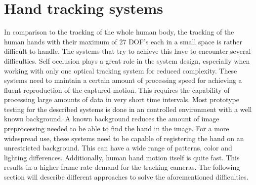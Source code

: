 \section{Hand tracking systems}
\label{hand-tracking_systems}
In comparison to the tracking of the whole human body, the tracking of the human hands with their maximum of 27 DOF's each in a small space is rather difficult to handle.
The systems that try to achieve this have to encounter several difficulties. Self occlusion plays a great role in the system design, especially when working with only one optical tracking system for reduced complexity.  These systems need to maintain a certain amount of processing speed for achieving a fluent reproduction of the captured motion. This requires the capability of processing large amounts of data in very short time intervals. Most prototype testing for the described systems is done in an controlled environment with a well known background. A known background reduces the amount of image preprocessing needed to be able to find the hand in the image. For a more widespread use, these systems need to be capable of registering the hand on an unrestricted background. This can have a wide range of patterns, color and lighting differences. Additionally, human hand motion itself is quite fast. This results in a higher frame rate demand for the tracking cameras.
The following section will describe different approaches to solve the aforementioned difficulties.
